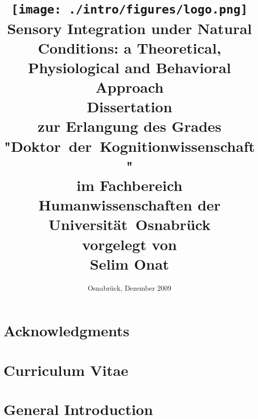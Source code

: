 \documentclass[a4paper,11pt]{report}
\date{Osnabr\"uck, Dezember 2009}
\begin{document}
\pagestyle{plain}

\title{
\texttt{[image: ./intro/figures/logo.png]}\\
\vspace{1.2cm}
\huge{\textbf{Sensory Integration under Natural Conditions: a Theoretical,
Physiological and Behavioral Approach}}\\[1.2cm]
\Large{
Dissertation \\
zur Erlangung des Grades \\
"Doktor~der~Kognitionwissenschaft"\\
im Fachbereich Humanwissenschaften der\\ 
Universit\"at~Osnabr\"uck} \\[1.2cm]
vorgelegt von \\ [0.5cm]
\Large{\textbf{Selim Onat}} \\[1.2cm]
}

\maketitle
\chapter*{Acknowledgments} 
		
\chapter*{Curriculum Vitae}		
		

\begin{abstract} 
 
\end{abstract}

\tableofcontents 
\listoffigures


\newpage
{}

\pagestyle{fancy}
\fancyhead{}
\fancyfoot{}
\renewcommand{\chaptermark}[1]{\markboth{\chaptername.\thechapter{ }#1}{}}
\renewcommand{\sectionmark}[1]{\markright{\thesection.\ #1}}
\fancyhead[OC]{\leftmark}
\fancyhead[EC]{\rightmark}
\fancyfoot[EL,OR]{\thepage}


	\chapter{General Introduction}
	 
		
\end{document}
